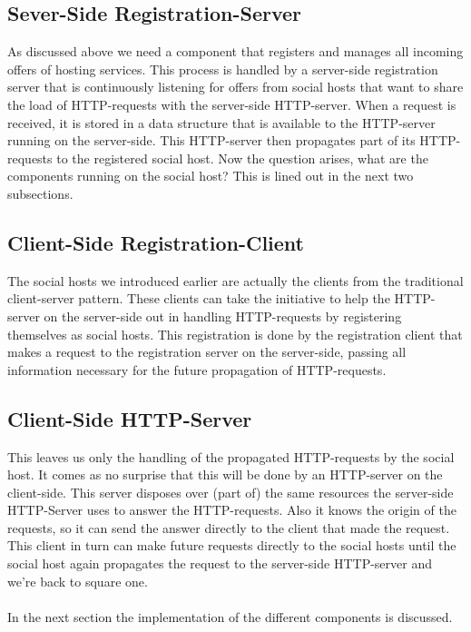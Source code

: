 \documentclass[a4paper, 10pt]{article}
\begin{document}
\subsection{Sever-Side Registration-Server}
As discussed above we need a component that registers and manages all incoming offers of hosting services. This process is handled by a server-side registration server that is continuously listening for offers from social hosts that want to share the load of HTTP-requests with the server-side HTTP-server. When a request is received, it is stored in a data structure that is available to the HTTP-server running on the server-side. This HTTP-server then propagates part of its HTTP-requests to the registered social host. Now the question arises, what are the components running on the social host? This is lined out in the next two subsections.

\subsection{Client-Side Registration-Client}
The social hosts we introduced earlier are actually the clients from the traditional client-server pattern. These clients can take the initiative to help the HTTP-server on the server-side out in handling HTTP-requests by registering themselves as social hosts. This registration is done by the registration client that makes a request to the registration server on the server-side, passing all information necessary for the future propagation of HTTP-requests. 

\subsection{Client-Side HTTP-Server}
This leaves us only the handling of the propagated HTTP-requests by the social host. It comes as no surprise that this will be done by an HTTP-server on the client-side. This server disposes over (part of) the same resources the server-side HTTP-Server uses to answer the HTTP-requests. Also it knows the origin of the requests, so it can send the answer directly to the client that made the request. This client in turn can make future requests directly to the social hosts until the social host again propagates the request to the server-side HTTP-server and we're back to square one.
\\
\\
In the next section the implementation of the different components is discussed.
\end{document}

